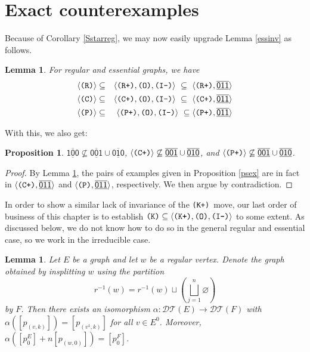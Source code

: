 \documentclass[12pt]{amsbook}%
\newtheorem{propo}[theor]{Proposition}
\newtheorem{lemma}[theor]{Lemma}
\theoremstyle{defin}
\theoremstyle{remark}
\numberwithin{equation}{chapter}
\numberwithin{theor}{section}
\newcommand{\xyzrel}[1]{\mbox{$\overline{\underline{\mathsf{ #1}}}$}}
\newcommand{\IIIm}{\mbox{\texttt{\textup{(I-)}}}}
\newcommand{\OOO}{\mbox{\texttt{\textup{(O)}}}}
\newcommand{\CCC}{\mbox{\texttt{\textup{(C)}}}}
\newcommand{\CCCp}{\mbox{\texttt{\textup{(C+)}}}}
\newcommand{\RRR}{\mbox{\texttt{\textup{(R)}}}}
\newcommand{\RRRp}{\mbox{\texttt{\textup{(R+)}}}}
\newcommand{\PPP}{\mbox{\texttt{\textup{(P)}}}}
\newcommand{\PPPp}{\mbox{\texttt{\textup{(P+)}}}}
\newcommand{\KKKp}{\mbox{\texttt{\textup{(K+)}}}}
\newcommand{\KKK}{\mbox{\texttt{\textup{(K)}}}}
\newcommand{\DT}{\mathcal{DT}}
\renewcommand{\emptyset}{\varnothing}
\begin{document}
\section{Exact counterexamples}

Because of Corollary \ref{Sstarreg}, we may now easily upgrade Lemma \ref{essinv} as follows.

 \begin{lemma}\label{essinviiRPC} For regular and essential graphs, we have
 \begin{eqnarray*}
 \langle\RRR\rangle&\subseteq&\langle\RRRp,\OOO,\IIIm\rangle\ \subseteq\ \langle \RRRp,\xyzrel{011}\rangle\\ 
 \langle\CCC\rangle&\subseteq&\langle\CCCp,\OOO,\IIIm\rangle\ \subseteq\ \langle\CCCp,\xyzrel{011}\rangle\\ 
 \langle\PPP\rangle&\subseteq&\langle\PPPp,\OOO,\IIIm\rangle\ \subseteq \langle\PPPp,\xyzrel{011}\rangle\\ 
 \end{eqnarray*}
  \end{lemma}  
  
  With this, we also get:
  
      \begin{propo}\label{psexplus}
  $\xyzrel{100}\not\subseteq \xyzrel{001}\cup\xyzrel{010}$,   $\langle\CCCp\rangle\not\subseteq \xyzrel{001}\cup\xyzrel{010}$, and $\langle\PPPp\rangle\not\subseteq \xyzrel{001}\cup\xyzrel{010}$.
  \end{propo}
  \begin{proof}
By Lemma \ref{essinviiRPC}, the pairs of examples given in Proposition \ref{psex} are in fact in  $\langle\CCCp,\xyzrel{011}\rangle$ and $\langle\PPP,\xyzrel{011}\rangle$, respectively. We then argue by contradiction.
  \end{proof}
  
In order to show a similar lack of invariance of the \KKKp\ move, our last order of business of this chapter is to establish $\KKK\subseteq \langle\KKKp,\OOO,\IIIm\rangle$ to some extent. As discussed below, we do not know how to do so in the general regular and essential case, so we work in the 
 irreducible case.
  
\begin{lemma}\label{lem:I-Kthy}
Let $E$ be a graph and let $w$ be a regular vertex.   Denote the graph obtained by insplitting $w$ using the partition 
$$r^{-1}(w)=r^{-1}(w) \sqcup \left( \bigsqcup_{j=1}^n \emptyset\right)$$
by $F$.  Then there exists an isomorphism $\alpha \colon \DT(E)\to\DT(F)$ with $\alpha ( [ p_{(v, k) }] )= [ p_{(v^1,  k)} ]$ for all $v\in E^0$.  Moreover, $\alpha ( [ p_0^E] + n [p_{(w,0)}] )= [ p_0^F]$.  
\end{lemma}
\end{document}
